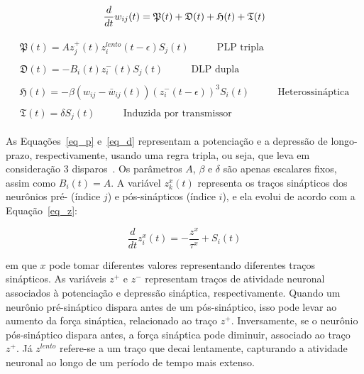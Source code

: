 \begin{samepage}

\begin{equation}
\label{eq_pdtd}
\frac{d}{dt}w_{ij}(t) = \mathfrak{P}(t) + \mathfrak{D}(t) + \mathfrak{H}(t) + \mathfrak{T}(t)\\
\end{equation}

\begin{align}
\begin{split}\label{eq_p}
  \mathfrak{P}(t) = Az_j^+(t) z_i^{lento}(t - \epsilon)S_j(t){} & \quad\quad\text{PLP tripla}
\end{split}\\
\begin{split}\label{eq_d}
  \mathfrak{D}(t) = - B_i(t)z_i^- (t)S_j(t){} & \quad\quad\text{DLP dupla}
\end{split}\\
\begin{split}\label{eq_h}
  \mathfrak{H}(t) = - \beta (w_{ij} - \bar{w}_{ij}(t)) (z_i^- (t - \epsilon))^3 S_i(t){} & \quad\quad\text{Heterossináptica}
\end{split}\\
\begin{split}\label{eq_t}
  \mathfrak{T}(t) = \delta S_j(t){} & \quad\quad\text{Induzida por transmissor}
\end{split}
\end{align}

\end{samepage}

As Equações~\ref{eq_p} e~\ref{eq_d} representam a potenciação e a depressão de longo-prazo, respectivamente, usando uma regra
tripla, ou seja, que leva em consideração 3 disparos~\cite{pfisterTriplets2006}. Os parâmetros $A$, $\beta$ e $\delta$ são apenas
escalares fixos, assim como $B_i(t)=A$. A variável $z_k^x(t)$ representa os traços sinápticos dos neurônios pré- (índice $j$) e
pós-sinápticos (índice $i$), e ela evolui de acordo com a Equação~\ref{eq_z}:

\begin{equation}
\label{eq_z}
\frac{d}{dt}z_i^x(t) = - \frac{z^x}{\tau^x}+S_i(t)
\end{equation}

\noindent{}em que $x$ pode tomar diferentes valores representando diferentes traços sinápticos. As variáveis $z^+$ e $z^-$
representam traços de atividade neuronal associados à potenciação e depressão sináptica, respectivamente. Quando um neurônio
pré-sináptico dispara antes de um pós-sináptico, isso pode levar ao aumento da força sináptica, relacionado ao traço $z^+$.
Inversamente, se o neurônio pós-sináptico dispara antes, a força sináptica pode diminuir, associado ao traço $z^+$. Já $z^{lento}$
refere-se a um traço que decai lentamente, capturando a atividade neuronal ao longo de um período de tempo mais extenso.

